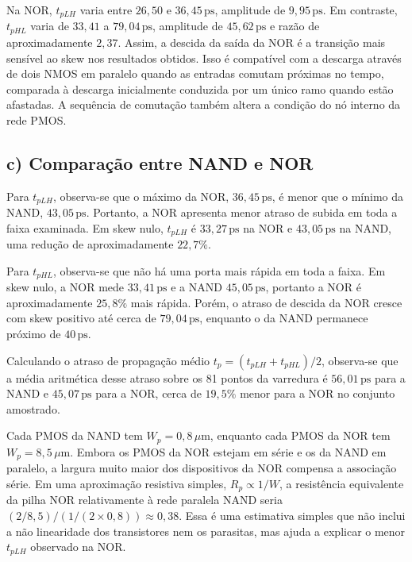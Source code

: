\documentclass[a4paper]{article}
\begin{document}
Na NOR, $t_{pLH}$ varia entre $26{,}50$ e $36{,}45\,\mathrm{ps}$, amplitude de $9{,}95\,\mathrm{ps}$. Em contraste, $t_{pHL}$ varia de $33{,}41$ a $79{,}04\,\mathrm{ps}$, amplitude de $45{,}62\,\mathrm{ps}$ e razão de aproximadamente $2{,}37$. Assim, a descida da saída da NOR é a transição mais sensível ao skew nos resultados obtidos. Isso é compatível com a descarga através de dois NMOS em paralelo quando as entradas comutam próximas no tempo, comparada à descarga inicialmente conduzida por um único ramo quando estão afastadas. A sequência de comutação também altera a condição do nó interno da rede PMOS.

\FloatBarrier

\subsection{c) Comparação entre NAND e NOR}

Para $t_{pLH}$, observa-se que o máximo da NOR, $36{,}45\,\mathrm{ps}$, é menor que o mínimo da NAND, $43{,}05\,\mathrm{ps}$. Portanto, a NOR apresenta menor atraso de subida em toda a faixa examinada. Em skew nulo, $t_{pLH}$ é $33{,}27\,\mathrm{ps}$ na NOR e $43{,}05\,\mathrm{ps}$ na NAND, uma redução de aproximadamente $22{,}7\%$.

Para $t_{pHL}$, observa-se que não há uma porta mais rápida em toda a faixa. Em skew nulo, a NOR mede $33{,}41\,\mathrm{ps}$ e a NAND $45{,}05\,\mathrm{ps}$, portanto a NOR é aproximadamente $25{,}8\%$ mais rápida. Porém, o atraso de descida da NOR cresce com skew positivo até cerca de $79{,}04\,\mathrm{ps}$, enquanto o da NAND permanece próximo de $40\,\mathrm{ps}$.

Calculando o atraso de propagação médio $t_p=(t_{pLH}+t_{pHL})/2$, observa-se que a média aritmética desse atraso sobre os 81 pontos da varredura é $56{,}01\,\mathrm{ps}$ para a NAND e $45{,}07\,\mathrm{ps}$ para a NOR, cerca de $19{,}5\%$ menor para a NOR no conjunto amostrado.

Cada PMOS da NAND tem $W_p=0{,}8\,\mu\mathrm{m}$, enquanto cada PMOS da NOR tem $W_p=8{,}5\,\mu\mathrm{m}$. Embora os PMOS da NOR estejam em série e os da NAND em paralelo, a largura muito maior dos dispositivos da NOR compensa a associação série. Em uma aproximação resistiva simples, $R_p\propto1/W$, a resistência equivalente da pilha NOR relativamente à rede paralela NAND seria $(2/8{,}5)/(1/(2\times0{,}8))\approx0{,}38$. Essa é uma estimativa simples que não inclui a não linearidade dos transistores nem os parasitas, mas ajuda a explicar o menor $t_{pLH}$ observado na NOR.
\end{document}
